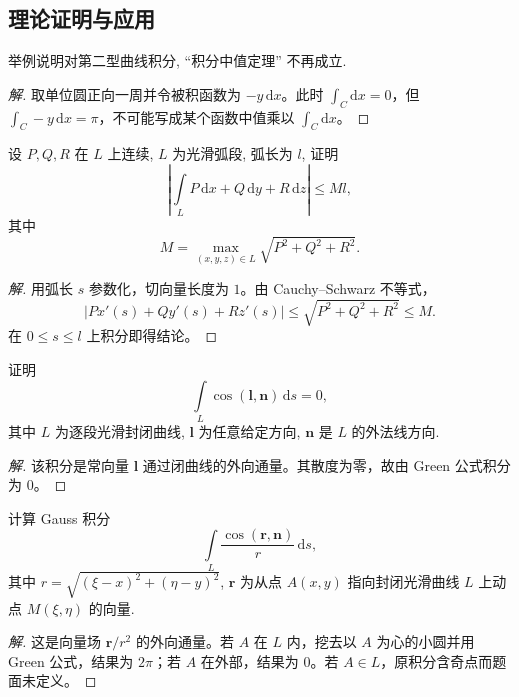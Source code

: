 \documentclass[../../数学分析培优讲义(答案版).tex]{subfiles}
\begin{document}
\subsection{理论证明与应用}

\begin{example}
举例说明对第二型曲线积分, ``积分中值定理'' 不再成立.
\end{example}

\begin{proof}[解]
取单位圆正向一周并令被积函数为 $-y\,\mathrm{d}x$。此时 $\int_C\mathrm{d}x=0$，但 $\int_C-y\,\mathrm{d}x=\pi$，不可能写成某个函数中值乘以 $\int_C\mathrm{d}x$。
\end{proof}

\begin{example}
设 $P,Q,R$ 在 $L$ 上连续, $L$ 为光滑弧段, 弧长为 $l$, 证明
\[
    \left|\int\limits_LP\,\mathrm{d}x+Q\,\mathrm{d}y+R\,\mathrm{d}z\right|\leq Ml,
\]
其中
\[
    M=\max_{(x,y,z)\in L}\sqrt{P^2+Q^2+R^2}.
\]
\end{example}

\begin{proof}[解]
用弧长 $s$ 参数化，切向量长度为 $1$。由 Cauchy--Schwarz 不等式，
\[
|P x'(s)+Q y'(s)+R z'(s)|\leq\sqrt{P^2+Q^2+R^2}\leq M.
\]
在 $0\leq s\leq l$ 上积分即得结论。
\end{proof}

\begin{example}
证明
\[
    \int\limits_L\cos(\bm l,\bm n)\,\mathrm{d}s=0,
\]
其中 $L$ 为逐段光滑封闭曲线, $\bm l$ 为任意给定方向, $\bm n$ 是 $L$ 的外法线方向.
\end{example}

\begin{proof}[解]
该积分是常向量 $\bm l$ 通过闭曲线的外向通量。其散度为零，故由 Green 公式积分为 $0$。
\end{proof}

\begin{example}
计算 Gauss 积分
\[
    \int\limits_L\dfrac{\cos(\bm r,\bm n)}{r}\,\mathrm{d}s,
\]
其中 $r=\sqrt{(\xi-x)^2+(\eta-y)^2}$, $\bm r$ 为从点 $A(x,y)$ 指向封闭光滑曲线 $L$ 上动点 $M(\xi,\eta)$ 的向量.
\end{example}

\begin{proof}[解]
这是向量场 $\bm r/r^2$ 的外向通量。若 $A$ 在 $L$ 内，挖去以 $A$ 为心的小圆并用 Green 公式，结果为 $2\pi$；若 $A$ 在外部，结果为 $0$。若 $A\in L$，原积分含奇点而题面未定义。
\end{proof}
\end{document}
